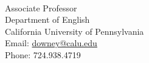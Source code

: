 \documentclass[letterpaper]{deedy-resume} %
\begin{document}
\begin{flushleft}
\\
Associate Professor\\
Department of English\\
California University of Pennsylvania\\
Email: \href{mailto:downey@calu.edu}{downey@calu.edu}\\
Phone: 724.938.4719

\end{flushleft}
\end{document}
